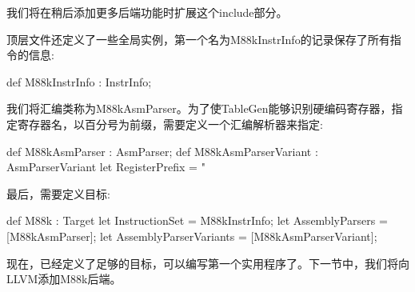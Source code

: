 我们将在稍后添加更多后端功能时扩展这个include部分。

顶层文件还定义了一些全局实例，第一个名为M88kInstrInfo的记录保存了所有指令的信息:

\begin{cpp}
def M88kInstrInfo : InstrInfo;
\end{cpp}

我们将汇编类称为M88kAsmParser。为了使TableGen能够识别硬编码寄存器，指定寄存器名，以百分号为前缀，需要定义一个汇编解析器来指定:

\begin{cpp}
def M88kAsmParser : AsmParser;
def M88kAsmParserVariant : AsmParserVariant {
    let RegisterPrefix = "%
}
\end{cpp}

最后，需要定义目标:

\begin{cpp}
def M88k : Target {
    let InstructionSet = M88kInstrInfo;
    let AssemblyParsers = [M88kAsmParser];
    let AssemblyParserVariants = [M88kAsmParserVariant];
}
\end{cpp}

现在，已经定义了足够的目标，可以编写第一个实用程序了。下一节中，我们将向LLVM添加M88k后端。





